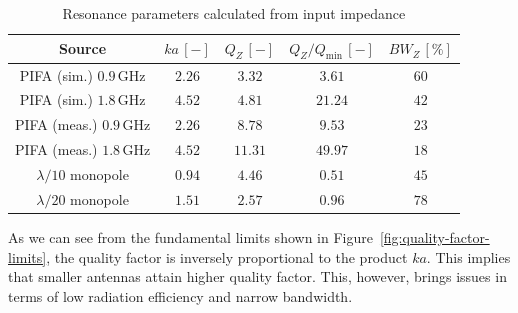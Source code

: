 \documentclass[11pt,a4paper]{article}
\begin{document}
            \begin{table}[!ht]
                \centering
                \begin{tabular}{|c||c|c|c|c|}
                    \hline
                    Source & $ka\, [-]$ & $Q_Z\, [-]$ & $Q_Z/Q_{\mathrm{min}}\, [-]$ & $\mathit{BW}_Z\, [\%]$\\
                    \hline\hline
                    \makecell{PIFA (sim.)\\$0.9\, \mathrm{GHz}$} & $2.26$ & $3.32$ & $3.61$ & $60$\\
                    \hline
                    \makecell{PIFA (sim.)\\$1.8\, \mathrm{GHz}$} & $4.52$ & $4.81$ & $21.24$ & $42$\\
                    \hline
                    \makecell{PIFA (meas.)\\$0.9\, \mathrm{GHz}$} & $2.26$ & $8.78$ & $9.53$ & $23$\\
                    \hline
                    \makecell{PIFA (meas.)\\$1.8\, \mathrm{GHz}$} & $4.52$ & $11.31$ & $49.97$ & $18$\\
                    \hline
                    \makecell{$\lambda/10$\\monopole} & $0.94$ &  $4.46$ & $0.51$ & $45$\\
                    \hline
                    \makecell{$\lambda/20$\\monopole} & $1.51$ & $2.57$ & $0.96$ & $78$\\
                    \hline
                \end{tabular}
                \caption{\label{table:quality-factor-qz}Resonance parameters calculated from input impedance}
            \end{table}

            As we can see from the fundamental limits shown in Figure~\ref{fig:quality-factor-limits}, the quality factor is inversely proportional to the product $ka$. This implies that smaller antennas attain higher quality factor. This, however, brings issues in terms of low radiation efficiency and narrow bandwidth.
        
\end{document}
